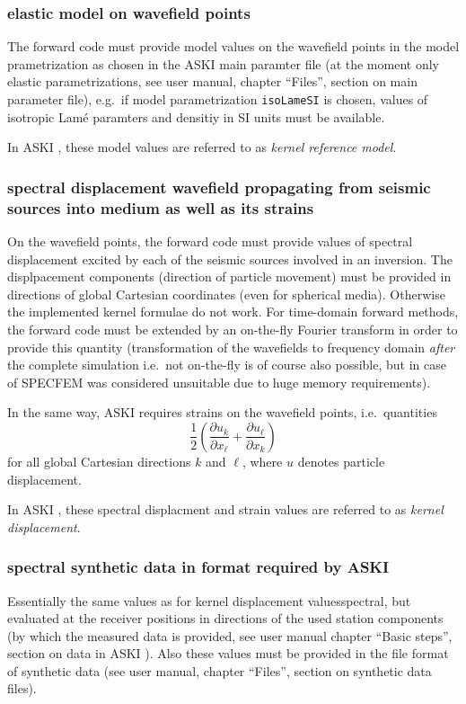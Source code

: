 \documentclass[12pt,a4paper]{article}
\newcommand{\lcode}[1]{\nolinkurl{#1}}
\newcommand{\ASKI}{ {\ttfamily ASKI} }
\begin{document}
\subsubsection{elastic model on wavefield points}
The forward code must provide model values on the wavefield points in the model prametrization as chosen in 
the \ASKI{} main paramter file (at the moment only elastic parametrizations, see user manual, chapter ``Files'', 
section on main parameter file), e.g.\ if model parametrization \lcode{isoLameSI} is chosen, values of 
isotropic Lam\'e paramters and densitiy in SI units must be available.

In \ASKI{}, these model values are referred to as \emph{kernel reference model}.

\subsubsection{spectral displacement wavefield propagating from seismic sources into medium as well as its strains}
On the wavefield points, the forward code must provide values of spectral displacement excited by each of the seismic 
sources involved in an inversion. The displpacement components (direction of particle movement) must be provided 
in directions of global Cartesian coordinates (even for spherical media). Otherwise the implemented kernel formulae 
do not work. For time-domain forward methods, the forward code must be extended by an
on-the-fly Fourier transform in order to provide this quantity (transformation of the wavefields to 
frequency domain \emph{after} the complete simulation i.e.\ not on-the-fly is of course also possible, but in 
case of SPECFEM was considered unsuitable due to huge memory requirements).

In the same way, \ASKI{} requires strains on the wavefield points, i.e.\ quantities
\[
\frac{1}{2}\left(\frac{\partial u_k}{\partial x_\ell} + \frac{\partial u_\ell}{\partial x_k}\right)
\]
for all global Cartesian directions $k$ and $\ell$, where $u$ denotes particle displacement.

In \ASKI{}, these spectral displacment and strain values are referred to as \emph{kernel displacement}.

\subsubsection{spectral synthetic data in format required by \ASKI{}}
Essentially the same values as for kernel displacement valuesspectral, but evaluated at the receiver positions 
in directions of the used station components (by which the measured data is provided, see user manual chapter
``Basic steps'', section on data in \ASKI{}). Also these values must be provided in the file format of synthetic
data (see user manual, chapter ``Files'', section on synthetic data files).
\end{document}
